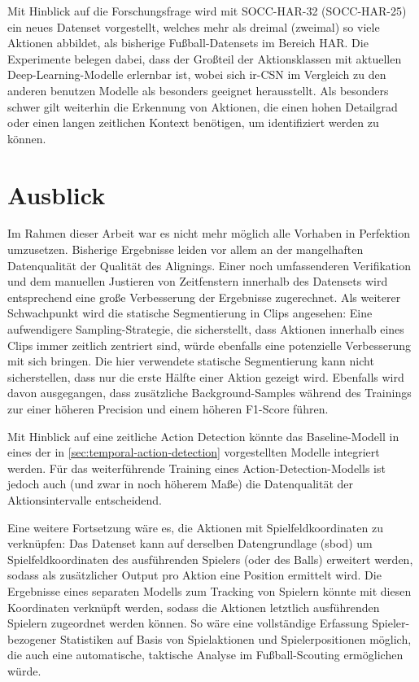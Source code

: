 Mit Hinblick auf die Forschungsfrage wird mit SOCC-HAR-32 (\bzw SOCC-HAR-25) ein neues Datenset vorgestellt, welches mehr als dreimal (\bzw zweimal) so viele Aktionen abbildet, als bisherige Fußball-Datensets im Bereich HAR.
Die Experimente belegen dabei, dass der Großteil der Aktionsklassen mit aktuellen Deep-Learning-Modelle erlernbar ist, wobei sich ir-CSN im Vergleich zu den anderen benutzen Modelle als besonders geeignet herausstellt.
Als besonders schwer gilt weiterhin die Erkennung von Aktionen, die einen hohen Detailgrad oder einen langen zeitlichen Kontext benötigen, um identifiziert werden zu können.

\section{Ausblick}
\label{sec:ausblick}

Im Rahmen dieser Arbeit war es nicht mehr möglich alle Vorhaben in Perfektion umzusetzen.
Bisherige Ergebnisse leiden vor allem an der mangelhaften Datenqualität \bzw der Qualität des Alignings.
Einer noch umfassenderen Verifikation und dem manuellen Justieren von Zeitfenstern innerhalb des Datensets wird entsprechend eine große Verbesserung der Ergebnisse zugerechnet.
Als weiterer Schwachpunkt wird die statische Segmentierung in Clips angesehen:
Eine aufwendigere Sampling-Strategie, die sicherstellt, dass Aktionen innerhalb eines Clips immer zeitlich zentriert sind, würde ebenfalls eine potenzielle Verbesserung mit sich bringen.
Die hier verwendete statische Segmentierung kann \zB nicht sicherstellen, dass nur die erste Hälfte einer Aktion gezeigt wird.
Ebenfalls wird davon ausgegangen, dass zusätzliche Background-Samples während des Trainings zur einer höheren Precision und einem höheren F1-Score führen.

Mit Hinblick auf eine zeitliche Action Detection könnte das Baseline-Modell in eines der in \autoref{sec:temporal-action-detection} vorgestellten Modelle integriert werden.
Für das weiterführende Training eines Action-Detection-Modells ist jedoch auch (und zwar in noch höherem Maße) die Datenqualität der Aktionsintervalle entscheidend.

Eine weitere Fortsetzung wäre es, die Aktionen mit Spielfeldkoordinaten zu verknüpfen:
Das Datenset kann auf derselben Datengrundlage (\gls{sbod}) um Spielfeldkoordinaten des ausführenden Spielers (oder des Balls) erweitert werden, sodass als zusätzlicher Output pro Aktion eine Position ermittelt wird.
Die Ergebnisse eines separaten Modells zum Tracking von Spielern könnte mit diesen Koordinaten verknüpft werden, sodass die Aktionen letztlich ausführenden Spielern zugeordnet werden können.
So wäre eine vollständige Erfassung Spieler-bezogener Statistiken auf Basis von Spielaktionen und Spielerpositionen möglich, die auch eine automatische, taktische Analyse im Fußball-Scouting ermöglichen würde.


